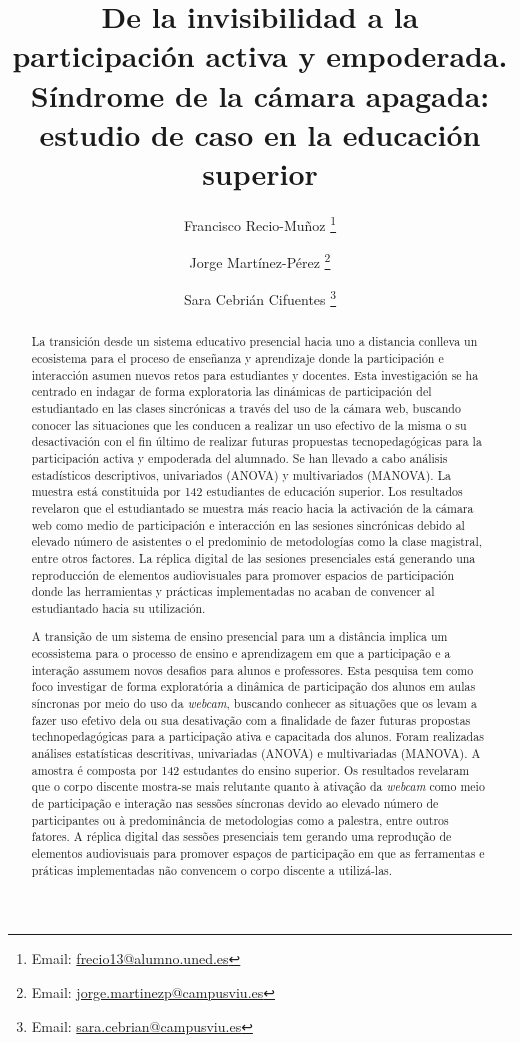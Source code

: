 \documentclass[spanish]{textolivre}
\title{De la invisibilidad a la participación activa y empoderada. Síndrome de la cámara apagada: estudio de caso en la educación superior}
\author[1]{Francisco Recio-Muñoz \orcid{0000-0003-0090-6040}\thanks{Email: \url{frecio13@alumno.uned.es}}}
\author[2]{Jorge Martínez-Pérez \orcid{0000-0003-1861-3609}\thanks{Email: \url{jorge.martinezp@campusviu.es}}}
\author[2]{Sara Cebrián Cifuentes \orcid{0000-0002-2120-8113}\thanks{Email: \url{sara.cebrian@campusviu.es}}}
\affil[1]{Universidad Nacional de Educación a Distancia, Facultad de Educación, Madrid, España.}
\affil[2]{Universidad Internacional de Valencia, Facultad de Educación, Valencia, España.}
\begin{document}
\maketitle

\begin{polyabstract}
\begin{abstract}
La transición desde un sistema educativo presencial hacia uno a distancia conlleva un ecosistema para el proceso de enseñanza y aprendizaje donde la participación e interacción asumen nuevos retos para estudiantes y docentes. Esta investigación se ha centrado en indagar de forma exploratoria las dinámicas de participación del estudiantado en las clases sincrónicas a través del uso de la cámara web, buscando conocer las situaciones que les conducen a realizar un uso efectivo de la misma o su desactivación con el fin último de realizar futuras propuestas tecnopedagógicas para la participación activa y empoderada del alumnado. Se han llevado a cabo análisis estadísticos descriptivos, univariados (ANOVA) y multivariados (MANOVA). La muestra está constituida por 142 estudiantes de educación superior. Los resultados revelaron que el estudiantado se muestra más reacio hacia la activación de la cámara web como medio de participación e interacción en las sesiones sincrónicas debido al elevado número de asistentes o el predominio de metodologías como la clase magistral, entre otros factores. La réplica digital de las sesiones presenciales está generando una reproducción de elementos audiovisuales para promover espacios de participación donde las herramientas y prácticas implementadas no acaban de convencer al estudiantado hacia su utilización.

\end{abstract}

\begin{portuguese}
\begin{abstract}
A transição de um sistema de ensino presencial para um a distância implica um ecossistema para o processo de ensino e aprendizagem em que a participação e a interação assumem novos desafios para alunos e professores. Esta pesquisa tem como foco investigar de forma exploratória a dinâmica de participação dos alunos em aulas síncronas por meio do uso da \textit{webcam}, buscando conhecer as situações que os levam a fazer uso efetivo dela ou sua desativação com a finalidade de fazer futuras propostas technopedagógicas para a participação ativa e capacitada dos alunos. Foram realizadas análises estatísticas descritivas, univariadas (ANOVA) e multivariadas (MANOVA). A amostra é composta por 142 estudantes do ensino superior. Os resultados revelaram que o corpo discente mostra-se mais relutante quanto à ativação da \textit{webcam} como meio de participação e interação nas sessões síncronas devido ao elevado número de participantes ou à predominância de metodologias como a palestra, entre outros fatores. A réplica digital das sessões presenciais tem gerando uma reprodução de elementos audiovisuais para promover espaços de participação em que as ferramentas e práticas implementadas não convencem o corpo discente a utilizá-las.


\end{abstract}
\end{portuguese}
\end{polyabstract}
\end{document}
